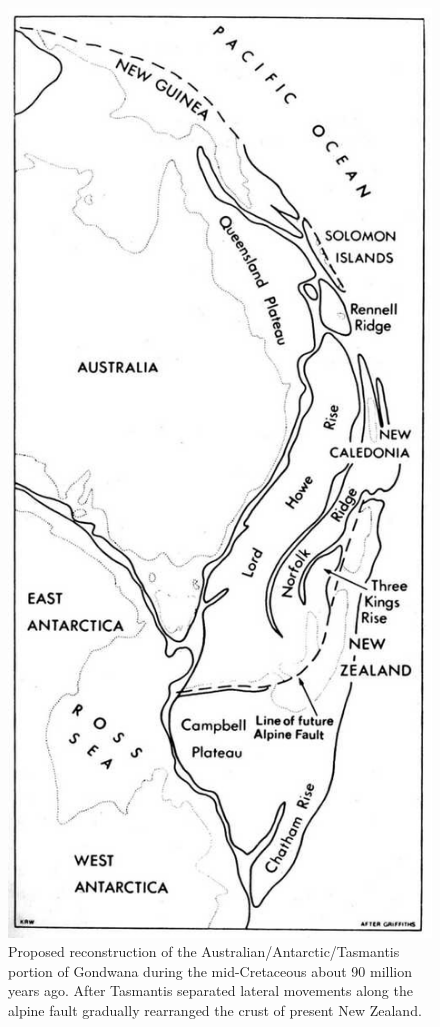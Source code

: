 \begin{figure}[htb]
\begin{minipage}[t]{0.45\textwidth}
    	\includegraphics[width=.7\textwidth]{graphics/figure3gondwana.jpg}
    	\caption[Proposed reconstruction of the Australian/Antarctic/Tasmantis portion of Gondwana]{Proposed reconstruction of the Australian/Antarctic/Tasmantis portion of Gondwana during the mid-Cretaceous about 90 million years ago.
    	After Tasmantis separated lateral movements along the alpine fault gradually rearranged the crust of present New Zealand.}%
    	\label{fig:3gondwana}
	\end{minipage}
\end{figure}

